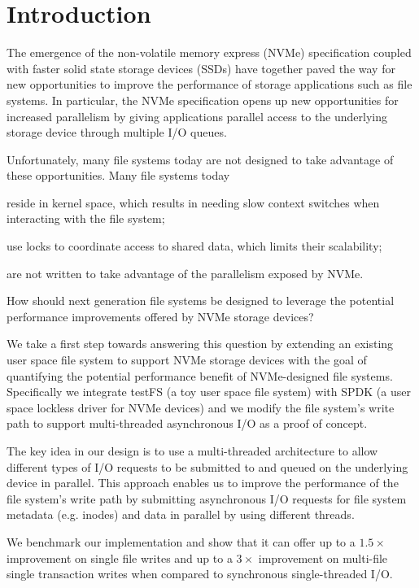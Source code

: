 \section{Introduction}
The emergence of the non-volatile memory express (NVMe) specification coupled
with faster solid state storage devices (SSDs) have together paved the way for
new opportunities to improve the performance of storage applications such as
file systems. In particular, the NVMe specification opens up new opportunities
for increased parallelism by giving applications parallel access to the
underlying storage device through multiple I/O queues.

Unfortunately, many file systems today are not designed to take advantage of
these opportunities. Many file systems today
\begin{enumerate*}[label={(\roman*)}]
  \item reside in kernel space, which results in needing slow context switches
    when interacting with the file system;
  \item use locks to coordinate access to shared data, which limits their
    scalability;
  \item are not written to take advantage of the parallelism exposed by NVMe.
\end{enumerate*}
How should next generation file systems be designed to leverage the potential
performance improvements offered by NVMe storage devices?

We take a first step towards answering this question by extending an existing
user space file system to support NVMe storage devices with the goal of
quantifying the potential performance benefit of NVMe-designed file systems.
Specifically we integrate testFS (a toy user space file system) with SPDK (a
user space lockless driver for NVMe devices) and we modify the file system's
write path to support multi-threaded asynchronous I/O as a proof of concept.

The key idea in our design is to use a multi-threaded architecture to allow
different types of I/O requests to be submitted to and queued on the underlying
device in parallel. This approach enables us to improve the performance of the
file system's write path by submitting asynchronous I/O requests for file
system metadata (e.g. inodes) and data in parallel by using different threads.

We benchmark our implementation and show that it can offer up to a $1.5\times$
improvement on single file writes and up to a $3\times$ improvement on
multi-file single transaction writes when compared to synchronous
single-threaded I/O.

